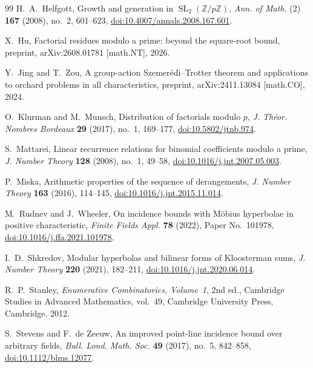 \documentclass[11pt,reqno]{amsart}
\numberwithin{equation}{section}
\theoremstyle{definition}
\theoremstyle{remark}
\newcommand{\SL}{\operatorname{SL}}
\begin{document}
\begin{thebibliography}{99}
H.~A.~Helfgott,
\newblock Growth and generation in $\SL_2(\mathbb Z/p\mathbb Z)$,
\newblock \emph{Ann. of Math.} (2) \textbf{167} (2008), no.~2, 601--623,
\newblock \href{https://doi.org/10.4007/annals.2008.167.601}{doi:10.4007/annals.2008.167.601}.

X.~Hu,
\newblock Factorial residues modulo a prime: beyond the square-root bound,
\newblock preprint, arXiv:2608.01781 [math.NT], 2026.

Y.~Jing and T.~Zou,
\newblock A group-action Szemer\'edi--Trotter theorem and applications to orchard problems in all characteristics,
\newblock preprint, arXiv:2411.13084 [math.CO], 2024.

O.~Klurman and M.~Munsch,
\newblock Distribution of factorials modulo $p$,
\newblock \emph{J. Th\'eor. Nombres Bordeaux} \textbf{29} (2017), no.~1, 169--177,
\newblock \href{https://doi.org/10.5802/jtnb.974}{doi:10.5802/jtnb.974}.

S.~Mattarei,
\newblock Linear recurrence relations for binomial coefficients modulo a prime,
\newblock \emph{J. Number Theory} \textbf{128} (2008), no.~1, 49--58,
\newblock \href{https://doi.org/10.1016/j.jnt.2007.05.003}{doi:10.1016/j.jnt.2007.05.003}.

P.~Miska,
\newblock Arithmetic properties of the sequence of derangements,
\newblock \emph{J. Number Theory} \textbf{163} (2016), 114--145,
\newblock \href{https://doi.org/10.1016/j.jnt.2015.11.014}{doi:10.1016/j.jnt.2015.11.014}.

M.~Rudnev and J.~Wheeler,
\newblock On incidence bounds with M\"obius hyperbolae in positive characteristic,
\newblock \emph{Finite Fields Appl.} \textbf{78} (2022), Paper No.~101978,
\newblock \href{https://doi.org/10.1016/j.ffa.2021.101978}{doi:10.1016/j.ffa.2021.101978}.

I.~D.~Shkredov,
\newblock Modular hyperbolas and bilinear forms of Kloosterman sums,
\newblock \emph{J. Number Theory} \textbf{220} (2021), 182--211,
\newblock \href{https://doi.org/10.1016/j.jnt.2020.06.014}{doi:10.1016/j.jnt.2020.06.014}.

R.~P.~Stanley,
\newblock \emph{Enumerative Combinatorics, Volume~1},
\newblock 2nd ed., Cambridge Studies in Advanced Mathematics, vol.~49,
Cambridge University Press, Cambridge, 2012.

S.~Stevens and F.~de Zeeuw,
\newblock An improved point-line incidence bound over arbitrary fields,
\newblock \emph{Bull. Lond. Math. Soc.} \textbf{49} (2017), no.~5, 842--858,
\newblock \href{https://doi.org/10.1112/blms.12077}{doi:10.1112/blms.12077}.


\end{thebibliography}
\end{document}
